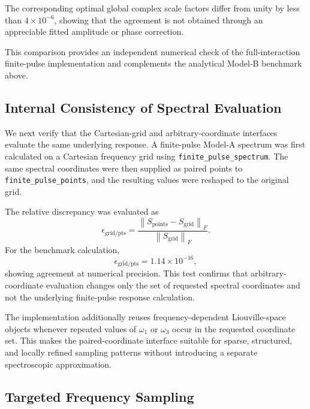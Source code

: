 The corresponding optimal global complex scale factors differ from
unity by less than $4\times10^{-6}$, showing that the agreement is not
obtained through an appreciable fitted amplitude or phase correction.

This comparison provides an independent numerical check of the
full-interaction finite-pulse implementation and complements the
analytical Model-B benchmark above.

\subsection{Internal Consistency of Spectral Evaluation}
\label{sec:validation_internal}

We next verify that the Cartesian-grid and arbitrary-coordinate
interfaces evaluate the same underlying response.
A finite-pulse Model-A spectrum was first calculated on a Cartesian
frequency grid using \texttt{finite\_pulse\_spectrum}.
The same spectral coordinates were then supplied as paired points to
\texttt{finite\_pulse\_points}, and the resulting values were reshaped
to the original grid.

The relative discrepancy was evaluated as
%
\begin{equation}
\epsilon_{\mathrm{grid/pts}}
=
\frac{
\left\|
S_{\mathrm{points}}-S_{\mathrm{grid}}
\right\|_F
}{
\left\|
S_{\mathrm{grid}}
\right\|_F
}.
\label{eq:grid_points_error}
\end{equation}
%
For the benchmark calculation,
%
\begin{equation}
\epsilon_{\mathrm{grid/pts}}
=
1.14\times10^{-16},
\end{equation}
%
showing agreement at numerical precision.
This test confirms that arbitrary-coordinate evaluation changes only
the set of requested spectral coordinates and not the underlying
finite-pulse response calculation.

The implementation additionally reuses frequency-dependent
Liouville-space objects whenever repeated values of $\omega_1$ or
$\omega_3$ occur in the requested coordinate set.
This makes the paired-coordinate interface suitable for sparse,
structured, and locally refined sampling patterns without introducing
a separate spectroscopic approximation.

\subsection{Targeted Frequency Sampling}
\label{sec:validation_sampling}

